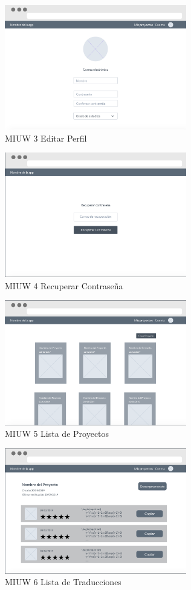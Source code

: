 \begin{figure}[H]
	\centering
	\includegraphics[width=300px]{capitulo4/imagenes/web/IUW_3.png}
	\caption{MIUW 3 Editar Perfil}
	\label{fig:MIUW-3}
\end{figure}

\begin{figure}[H]
	\centering
	\includegraphics[width=300px]{capitulo4/imagenes/web/IUW_4.png}
	\caption{MIUW 4 Recuperar Contraseña}
	\label{fig:MIUW-4}
\end{figure}

\begin{figure}[H]
	\centering
	\includegraphics[width=300px]{capitulo4/imagenes/web/IUW_5.png}
	\caption{MIUW 5 Lista de Proyectos}
	\label{fig:MIUW-5}
\end{figure}

\begin{figure}[H]
	\centering
	\includegraphics[width=300px]{capitulo4/imagenes/web/IUW_6.png}
	\caption{MIUW 6 Lista de Traducciones}
	\label{fig:MIUW-6}
\end{figure}

